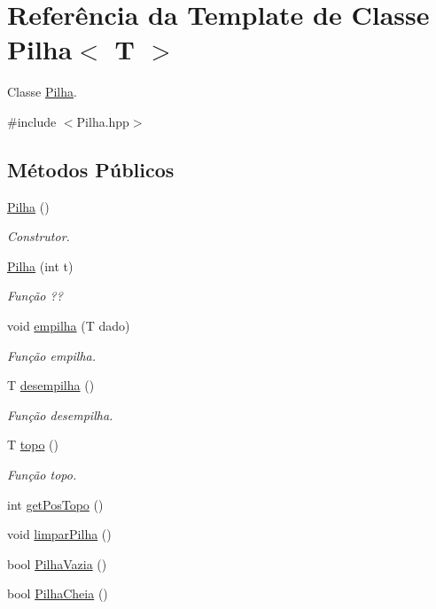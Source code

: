 \hypertarget{classPilha}{}\section{Referência da Template de Classe Pilha$<$ T $>$}
\label{classPilha}


Classe \hyperlink{classPilha}{Pilha}.  




{\ttfamily \#include $<$Pilha.\+hpp$>$}

\subsection*{Métodos Públicos}
\begin{DoxyCompactItemize}
\item 
\hyperlink{classPilha_a066b054518499c60f560574c5c41ea4b}{Pilha} ()
\begin{DoxyCompactList}\small\item\em Construtor. \end{DoxyCompactList}\item 
\hyperlink{classPilha_ad8d391fa928c0d252ba93d9f9ba34eee}{Pilha} (int t)
\begin{DoxyCompactList}\small\item\em Função ?? \end{DoxyCompactList}\item 
void \hyperlink{classPilha_afccf95487618a7adbefbb5d1913e40c5}{empilha} (T dado)
\begin{DoxyCompactList}\small\item\em Função empilha. \end{DoxyCompactList}\item 
T \hyperlink{classPilha_a672a2ffc835cf67ddc899103bbd40cfa}{desempilha} ()
\begin{DoxyCompactList}\small\item\em Função desempilha. \end{DoxyCompactList}\item 
T \hyperlink{classPilha_a8a3095ec3789e17f59638944c59e96d9}{topo} ()
\begin{DoxyCompactList}\small\item\em Função topo. \end{DoxyCompactList}\item 
int \hyperlink{classPilha_a5be4898a94180f60792a1570ae8e9dc8}{get\+Pos\+Topo} ()
\item 
void \hyperlink{classPilha_ae548d9c728780e9ca57da1d82795eec3}{limpar\+Pilha} ()
\item 
bool \hyperlink{classPilha_a457fa9cd5b5d5d9fe886373c03331ead}{Pilha\+Vazia} ()
\item 
bool \hyperlink{classPilha_a968d4ae81b03984633e801121c59da9b}{Pilha\+Cheia} ()
\end{DoxyCompactItemize}


